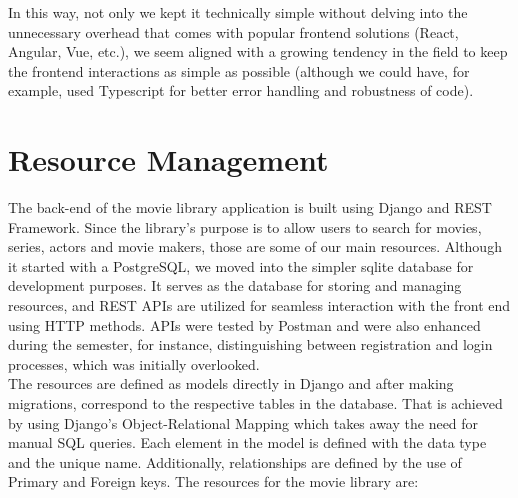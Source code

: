 \documentclass[letterpaper,twocolumn]{article}
\begin{document}
In this way, not only we kept it technically simple without delving into the unnecessary overhead that comes with popular frontend solutions (React, Angular, Vue, etc.), we seem aligned with a growing tendency in the field to keep the frontend interactions as simple as possible (although we could have, for example, used Typescript for better error handling and robustness of code). 


\section{Resource Management}

The back-end of the movie library application is built using Django and REST Framework. Since the library's purpose is to allow users to search for movies, series, actors and movie makers, those are some of our main resources. Although it started with a PostgreSQL, we moved into the simpler sqlite database for development purposes. It serves as the database for storing and managing resources, and REST APIs are utilized for seamless interaction with the front end using HTTP methods. APIs were tested by Postman and were also enhanced during the semester, for instance, distinguishing between registration and login processes, which was initially overlooked. \\

The resources are defined as models directly in Django and after making migrations, correspond to the respective tables in the database. That is achieved by using Django's Object-Relational Mapping which takes away the need for manual SQL queries. Each element in the model is defined with the data type and the unique name. Additionally, relationships are defined by the use of Primary and Foreign keys. The resources for the movie library are:
\end{document}
